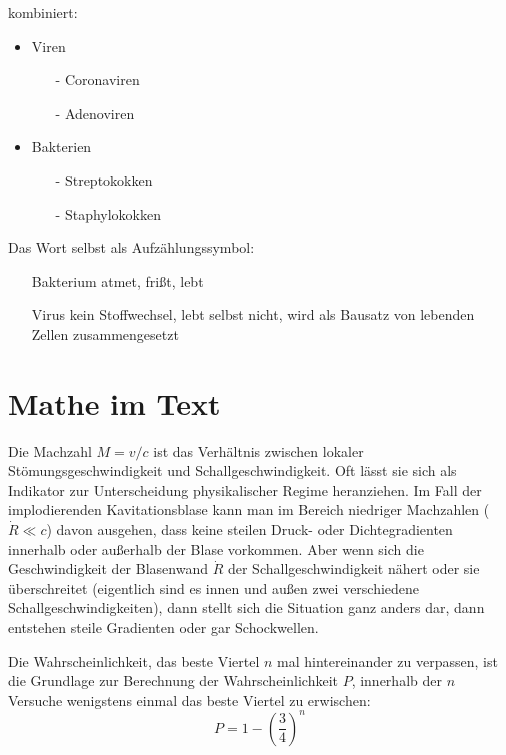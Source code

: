 \documentclass[11pt,a4paper,twoside,titlepage]{book}
\begin{document}
kombiniert:
\begin{itemize}
\item Viren
\begin{itemize}
\item[-] Coronaviren
\item[-] Adenoviren
\end{itemize}
\item Bakterien
\begin{itemize}
\item[-] Streptokokken
\item[-] Staphylokokken
\end{itemize}
\end{itemize}

Das Wort selbst als Aufzählungssymbol:
\begin{itemize}
\item[Bakterium] atmet, frißt, lebt
\item[Virus] kein Stoffwechsel, lebt selbst nicht, wird als Bausatz von lebenden Zellen zusammengesetzt
\end{itemize}


\chapter{Mathe im Text}%

Die Machzahl $M=v/c$ ist das Verhältnis zwischen lokaler Stömungsgeschwindigkeit und Schallgeschwindigkeit. Oft lässt sie sich als Indikator zur Unterscheidung physikalischer Regime heranziehen. Im Fall der implodierenden Kavitationsblase kann man im Bereich niedriger Machzahlen ($\dot{R}\ll c$) davon ausgehen, dass keine steilen Druck- oder Dichtegradienten innerhalb oder außerhalb der Blase vorkommen. Aber wenn sich die Geschwindigkeit der Blasenwand $\dot{R}$ der Schallgeschwindigkeit nähert oder sie überschreitet (eigentlich sind es innen und außen zwei verschiedene Schallgeschwindigkeiten), dann stellt sich die Situation ganz anders dar, dann entstehen steile Gradienten oder gar Schockwellen.

Die Wahrscheinlichkeit, das beste Viertel $n$ mal hintereinander zu verpassen, ist die Grundlage zur Berechnung der Wahrscheinlichkeit $P$, innerhalb der $n$ Versuche wenigstens einmal das beste Viertel zu erwischen:
\begin{equation}
P=1-\left( \frac{3}{4} \right)^n
\end{equation}

\end{document}

